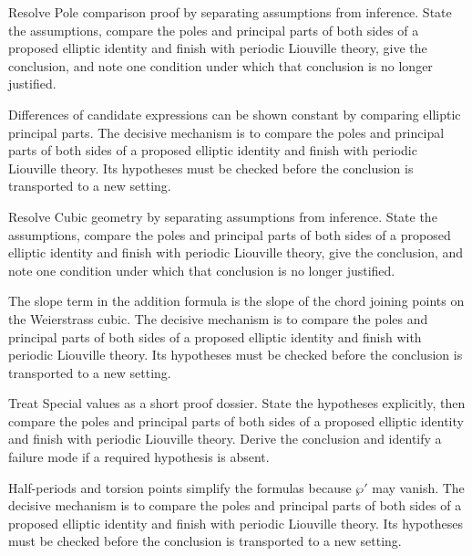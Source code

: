 \begin{problem}\label{prob:iv30-problem-06}
Resolve Pole comparison proof by separating assumptions from inference. State the assumptions, compare the poles and principal parts of both sides of a proposed elliptic identity and finish with periodic Liouville theory, give the conclusion, and note one condition under which that conclusion is no longer justified.
\end{problem}
\begin{solution}
Differences of candidate expressions can be shown constant by comparing elliptic principal parts. The decisive mechanism is to compare the poles and principal parts of both sides of a proposed elliptic identity and finish with periodic Liouville theory. Its hypotheses must be checked before the conclusion is transported to a new setting.
\end{solution}

\begin{problem}\label{prob:iv30-problem-07}
Resolve Cubic geometry by separating assumptions from inference. State the assumptions, compare the poles and principal parts of both sides of a proposed elliptic identity and finish with periodic Liouville theory, give the conclusion, and note one condition under which that conclusion is no longer justified.
\end{problem}
\begin{solution}
The slope term in the addition formula is the slope of the chord joining points on the Weierstrass cubic. The decisive mechanism is to compare the poles and principal parts of both sides of a proposed elliptic identity and finish with periodic Liouville theory. Its hypotheses must be checked before the conclusion is transported to a new setting.
\end{solution}

\begin{problem}\label{prob:iv30-problem-08}
Treat Special values as a short proof dossier. State the hypotheses explicitly, then compare the poles and principal parts of both sides of a proposed elliptic identity and finish with periodic Liouville theory. Derive the conclusion and identify a failure mode if a required hypothesis is absent.
\end{problem}
\begin{solution}
Half-periods and torsion points simplify the formulas because $\wp'$ may vanish. The decisive mechanism is to compare the poles and principal parts of both sides of a proposed elliptic identity and finish with periodic Liouville theory. Its hypotheses must be checked before the conclusion is transported to a new setting.
\end{solution}

